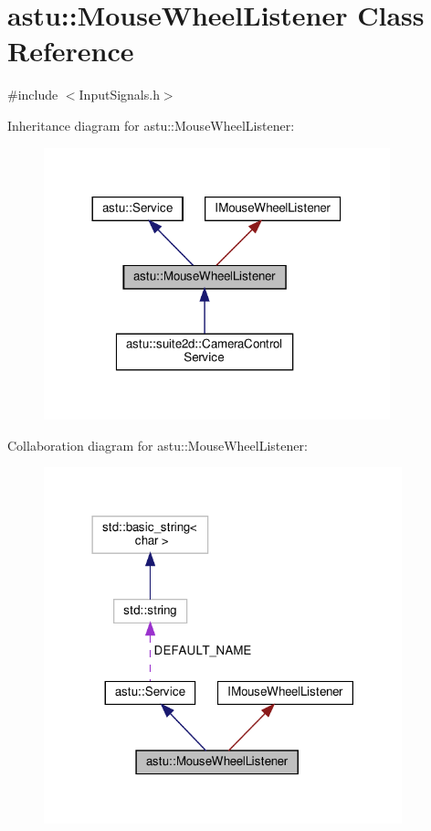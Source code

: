 \hypertarget{classastu_1_1MouseWheelListener}{}\section{astu\+:\+:Mouse\+Wheel\+Listener Class Reference}
\label{classastu_1_1MouseWheelListener}


{\ttfamily \#include $<$Input\+Signals.\+h$>$}



Inheritance diagram for astu\+:\+:Mouse\+Wheel\+Listener\+:\nopagebreak
\begin{figure}[H]
\begin{center}
\leavevmode
\includegraphics[width=284pt]{classastu_1_1MouseWheelListener__inherit__graph}
\end{center}
\end{figure}


Collaboration diagram for astu\+:\+:Mouse\+Wheel\+Listener\+:\nopagebreak
\begin{figure}[H]
\begin{center}
\leavevmode
\includegraphics[width=294pt]{classastu_1_1MouseWheelListener__coll__graph}
\end{center}
\end{figure}
